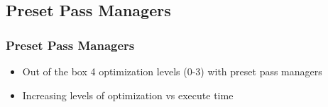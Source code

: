 \documentclass[aspectratio=169,11pt,hyperref={colorlinks=true}]{beamer}
\begin{document}
\subsection{Preset Pass Managers}
\begin{frame}
    \frametitle{Preset Pass Managers}
    \begin{itemize}
        \item Out of the box 4 optimization levels (0-3) with preset pass managers
        \item Increasing levels of optimization vs execute time
    \end{itemize}
    \begin{columns}
\end{columns}
\end{frame}
\end{document}
